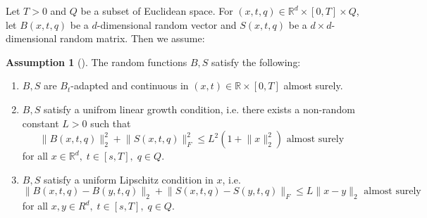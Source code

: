 \documentclass[12pt]{article}
\theoremstyle{definition}
\newtheorem{assumption}[assumption]{Assumption}
\numberwithin{equation}{section}
\newcommand{\R}{\mathbb{R}}
\newcommand{\norm}[1]{\lVert{#1}\rVert_2}
\newcommand{\normf}[1]{\lVert{#1}\rVert_F}
\begin{document}
Let $T > 0$ and $Q$ be a subset of Euclidean space. For $(x,t,q) \in \R^d \times [0,T] \times Q$, let $B(x,t,q)$ be a $d$-dimensional random vector and $S(x,t,q)$ be a $d \times d$-dimensional random matrix. Then we assume: 
\begin{assumption}[]
  \label{as:sde_existence}
  The random functions $B,S$ satisfy the following:
  \begin{enumerate}[label=(\roman*)]
    \item $B,S$ are $B_t$-adapted and continuous in $(x,t) \in \R \times [0,T]$ almost surely.
    \item $B,S$ satisfy a unifrom linear growth condition, i.e. there exists a non-random constant $L > 0$ such that
    \begin{equation*}
      \norm{B(x,t,q)}^2 + \normf{S(x,t,q)}^2 \leq L^2 (1 + \norm{x}^2) \text{ almost surely}
    \end{equation*}
    for all $x \in \R^d, \; t \in [s,T], \; q \in Q$.
    \item $B,S$ satisfy a uniform Lipschitz condition in $x$, i.e.
    \begin{equation*}
      \norm{B(x,t,q) - B(y,t,q)} + \normf{S(x,t,q) - S(y,t,q)} \leq L \norm{x - y}  \text{ almost surely}
    \end{equation*}
    for all $x,y \in R^d, \; t \in [s, T], \; q \in Q$.
  \end{enumerate}
\end{assumption}
\end{document}
